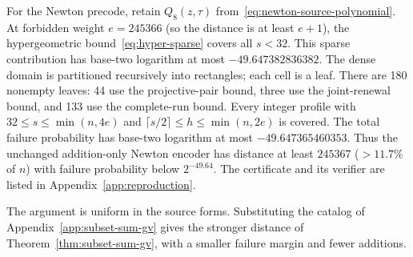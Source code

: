 For the Newton precode, retain $Q_8(z,\tau)$
from~\eqref{eq:newton-source-polynomial}. At forbidden weight
$e=245366$ (so the distance is at least $e+1$), the hypergeometric
bound~\eqref{eq:hyper-sparse} covers all $s<32$. This sparse
contribution has base-two logarithm at most $-49.647382836382$.
The dense domain is partitioned recursively into rectangles; each cell
is a leaf. There are 180 nonempty leaves: 44 use the projective-pair
bound, three use the joint-renewal bound, and 133 use the complete-run
bound. Every integer profile with $32\le s\le\min(n,4e)$ and
$\lceil s/2\rceil\le h\le\min(n,2e)$ is covered. The total failure
probability has base-two logarithm at most $-49.647365460353$. Thus the
unchanged addition-only Newton encoder has distance at least $245367$
($>11.7\%$ of $n$) with failure probability below $2^{-49.64}$.
The certificate and its verifier are listed in
Appendix~\ref{app:reproduction}.

The argument is uniform in the source forms. Substituting the catalog
of Appendix~\ref{app:subset-sum-gv} gives the stronger distance of
Theorem~\ref{thm:subset-sum-gv}, with a smaller failure margin and
fewer additions.
